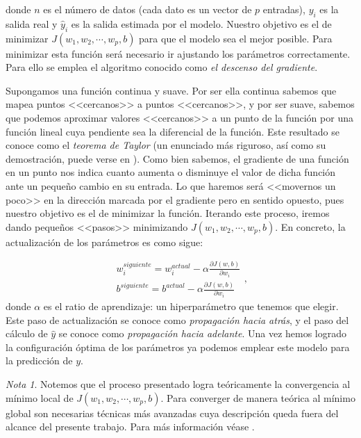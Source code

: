 \documentclass[12pt, a4paper, twoside]{book}
\numberwithin{equation}{section}
\theoremstyle{definition}
\theoremstyle{remark}
\newtheorem*{remark}{Nota}
\theoremstyle{plain}
\begin{document}
	\noindent donde $n$ es el número de datos (cada dato es un vector de $p$ 
	entradas), $y_{i}$ es la salida real y 
	$\hat{y}_{i}$ es la salida estimada por el modelo. Nuestro objetivo
	es el de minimizar $J(w_{1},w_{2},\cdots,w_{p},b)$ para que el modelo 
	sea el mejor posible. 
	Para minimizar esta función será necesario ir ajustando los parámetros 
	correctamente. Para ello se emplea el algoritmo conocido como 
	\emph{el descenso del gradiente}.

	Supongamos una función continua y suave. Por ser ella continua sabemos
	que mapea puntos <<cercanos>> a puntos <<cercanos>>, y por ser suave,
	sabemos que podemos aproximar valores <<cercanos>> a un punto de la 
	función por una función lineal cuya pendiente sea la diferencial de la 
	función. Este resultado se conoce como el \emph{teorema de Taylor} (un 
	enunciado más riguroso, así como su demostración, puede verse en 
	\cite{Diferencial-Bello}). 
	Como bien sabemos, el gradiente de una función en un punto 
	nos indica cuanto aumenta o disminuye el valor 
	de dicha función ante un pequeño cambio en su entrada. Lo que haremos 
	será <<movernos un poco>> en la dirección marcada por el gradiente 
	pero en sentido opuesto, pues nuestro objetivo 
	es el de minimizar la función. Iterando este proceso,
	iremos dando pequeños <<pasos>> minimizando $J(w_{1},w_{2},\cdots,
	w_{p},b)$. En concreto, la 
	actualización de los parámetros es como sigue:
	
	\begin{equation*}
	\begin{array}{c}
		w_{i}^{siguiente}=w_{i}^{actual}-\alpha\frac{\partial J(w,b)}
		{\partial w_{i}}\\
		b^{siguiente}=b^{actual}-\alpha\frac{\partial J(w,b)}
		{\partial w_{i}}
	\end{array},
	\end{equation*}
	donde $\alpha$ es el ratio de aprendizaje: un hiperparámetro que 
	tenemos que elegir. Este paso de actualización se conoce como 
	\emph{propagación hacia atrás}, y el paso del cálculo de $\hat{y}$ se 
	conoce como \emph{propagación hacia adelante}. Una vez hemos logrado 
	la 
	configuración óptima de los parámetros ya podemos emplear este modelo 
	para la predicción de $y$.
	
	\begin{remark}
	Notemos que el proceso presentado logra teóricamente la convergencia 
	al mínimo local de $J(w_{1},w_{2},\cdots,w_{p},b)$. Para converger de 
	manera teórica al 
	mínimo global son necesarias técnicas más avanzadas cuya descripción 
	queda fuera del alcance del presente trabajo. Para más información 
	véase \cite{Goodfellow-et-al-2016}.
	\end{remark}
\end{document}
